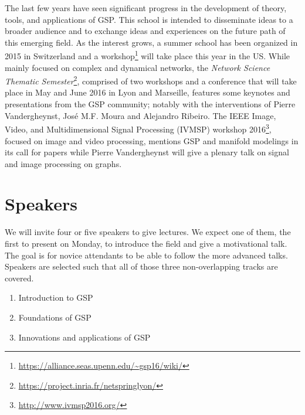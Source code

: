\documentclass[a4paper]{scrartcl}
\begin{document}
The last few years have seen significant progress in the development of theory,
tools, and applications of GSP. This school is intended to disseminate ideas to
a broader audience and to exchange ideas and experiences on the future path of
this emerging field.  As the interest grows, a summer school has been organized
in 2015 in Switzerland and a
workshop\footnote{\url{https://alliance.seas.upenn.edu/~gsp16/wiki/}} will take
place this year in the US.  While mainly focused on complex and dynamical
networks, the \textit{Network Science Thematic
Semester}\footnote{\url{https://project.inria.fr/netspringlyon/}}, comprised of
two workshops and a conference that will take place in May and June 2016 in Lyon
and Marseille, features some keynotes and presentations from the GSP community;
notably with the interventions of Pierre Vandergheynst, José M.F. Moura and
Alejandro Ribeiro.  The IEEE Image, Video, and Multidimensional Signal
Processing (IVMSP) workshop 2016\footnote{\url{http://www.ivmsp2016.org/}},
focused on image and video processing, mentions GSP and manifold modelings in
its call for papers while Pierre Vandergheynst will give a plenary talk on
signal and image processing on graphs.

\section{Speakers}

We will invite four or five speakers to give lectures. We expect one of them,
the first to present on Monday, to introduce the field and give a motivational
talk. The goal is for novice attendants to be able to follow the more advanced
talks. Speakers are selected such that all of those three non-overlapping tracks
are covered.
\begin{enumerate}
	\setlength{\itemsep}{0pt} \setlength{\parskip}{0pt}
	\item Introduction to GSP
	\item Foundations of GSP
	\item Innovations and applications of GSP
\end{enumerate} 
\end{document}
